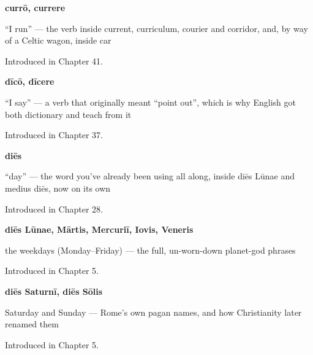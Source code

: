 \noindent\begin{minipage}[t]{\linewidth}
\raggedright
\textbf{currō, currere}\par
\small \textquotedblleft{}I run\textquotedblright{} — the verb inside current, curriculum, courier and corridor, and, by way of a Celtic wagon, inside car\par
\footnotesize Introduced in Chapter 41.
\end{minipage}\par\medskip

\noindent\begin{minipage}[t]{\linewidth}
\raggedright
\textbf{dīcō, dīcere}\par
\small \textquotedblleft{}I say\textquotedblright{} — a verb that originally meant \textquotedblleft{}point out\textquotedblright{}, which is why English got both dictionary and teach from it\par
\footnotesize Introduced in Chapter 37.
\end{minipage}\par\medskip

\noindent\begin{minipage}[t]{\linewidth}
\raggedright
\textbf{diēs}\par
\small \textquotedblleft{}day\textquotedblright{} — the word you've already been using all along, inside diēs Lūnae and medius diēs, now on its own\par
\footnotesize Introduced in Chapter 28.
\end{minipage}\par\medskip

\noindent\begin{minipage}[t]{\linewidth}
\raggedright
\textbf{diēs Lūnae, Mārtis, Mercuriī, Iovis, Veneris}\par
\small the weekdays (Monday–Friday) — the full, un-worn-down planet-god phrases\par
\footnotesize Introduced in Chapter 5.
\end{minipage}\par\medskip

\noindent\begin{minipage}[t]{\linewidth}
\raggedright
\textbf{diēs Saturnī, diēs Sōlis}\par
\small Saturday and Sunday — Rome's own pagan names, and how Christianity later renamed them\par
\footnotesize Introduced in Chapter 5.
\end{minipage}\par\medskip

